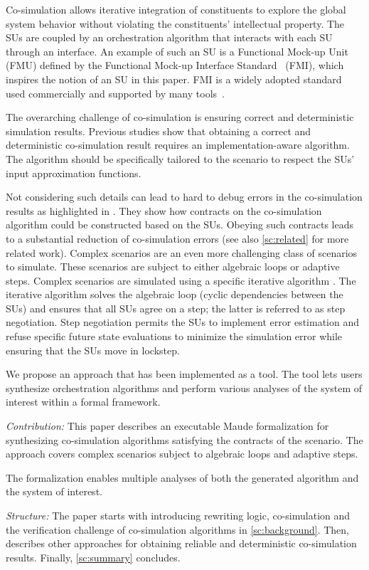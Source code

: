 Co-simulation allows iterative integration of constituents to explore the global system behavior without violating the constituents' intellectual property. 
The SUs are coupled by an orchestration algorithm that interacts with each SU through an interface.
An example of such an SU is a Functional Mock-up Unit (FMU) defined by the Functional Mock-up Interface Standard~\cite{FMI2014} (FMI), which inspires the notion of an SU in this paper. FMI is a widely adopted standard used commercially and supported by many tools~\cite{Tools_FMI}.

The overarching challenge of co-simulation is ensuring correct and deterministic simulation results. 
Previous studies \cite{Gomes2019,Oakes2021,Gomes2018f,Schweizer2015c} show that obtaining a correct and deterministic co-simulation result requires an implementation-aware algorithm.
The algorithm should be specifically tailored to the scenario to respect the SUs' input approximation functions.

Not considering such details can lead to hard to debug errors in the co-simulation results as highlighted in \cite{Gomes2019,Oakes2021}. 
They show how contracts on the co-simulation algorithm could be constructed based on the SUs. 
Obeying such contracts leads to a substantial reduction of co-simulation errors (see also \cref{sc:related} for more related work). 
Complex scenarios are an even more challenging class of scenarios to simulate.
These scenarios are subject to either algebraic loops or adaptive steps. 
Complex scenarios are simulated using a specific iterative algorithm \cite{thrane2021}. 
The iterative algorithm solves the algebraic loop (cyclic dependencies between the SUs) and ensures that all SUs agree on a step; the latter is referred to as step negotiation. 
Step negotiation permits the SUs to implement error estimation and refuse specific future state evaluations to minimize the simulation error while ensuring that the SUs move in lockstep.

We propose an approach that has been implemented as a tool. The tool lets users synthesize orchestration algorithms and perform various analyses of the system of interest within a formal framework.

\textit{Contribution:}
This paper describes an executable Maude formalization for synthesizing co-simulation algorithms satisfying the contracts of the scenario.
The approach covers complex scenarios subject to algebraic loops and adaptive steps.

The formalization enables multiple analyses of both the generated algorithm and the system of interest. 

\textit{Structure:}
The paper starts with introducing rewriting logic, co-simulation and the verification challenge of co-simulation algorithms in \cref{sc:background}. Then,  describes other approaches for obtaining reliable and deterministic co-simulation results. 
Finally, \cref{sc:summary} concludes.